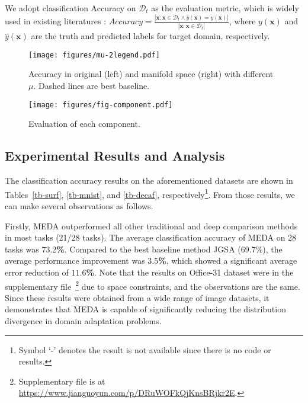 \documentclass[sigconf]{acmart}
\begin{document}
We adopt classification Accuracy on $\mathcal{D}_t$ as the evaluation metric, which is widely used in existing literatures \cite{pan2011domain,wang2017balanced,gong2012geodesic}: $Accuracy = \frac{|\mathbf{x}: \mathbf{x} \in \mathcal{D}_t \wedge \hat{y}(\mathbf{x})=y(\mathbf{x})|}{|\mathbf{x}:\mathbf{x} \in \mathcal{D}_t|}$, where $y(\mathbf{x})$ and $\hat{y}(\mathbf{x})$ are the truth and predicted labels for target domain, respectively.

\begin{figure}[t!]
	\centering
	\vspace{-.1in}
	\texttt{[image: figures/mu-2legend.pdf]}
	\vspace{-.1in}
	\caption{Accuracy in original (left) and manifold space (right) with different $\mu$. Dashed lines are best baseline.}
	\label{fig-mu}
	\vspace{-.1in}
\end{figure}

\begin{figure}[t!]
	\centering
	\vspace{-.1in}
	\texttt{[image: figures/fig-component.pdf]}
	\vspace{-.15in}
	\caption{Evaluation of each component.}
	\label{fig-component}
	\vspace{-.15in}
\end{figure}

\subsection{Experimental Results and Analysis}
The classification accuracy results on the aforementioned datasets are shown in Tables~\ref{tb-surf}, \ref{tb-mnist}, and \ref{tb-decaf}, respectively\footnote{Symbol `-' denotes the result is not available since there is no code or results.}. From those results, we can make several observations as follows. 

Firstly, MEDA outperformed all other traditional and deep comparison methods in most tasks (21/28 tasks). The average classification accuracy of MEDA on 28 tasks was $\bm{73.2}$\textbf{\%}. Compared to the best baseline method JGSA (69.7\%), the average performance improvement was $\bm{3.5}$\textbf{\%}, which showed a significant average error reduction of $\bm{11.6}$\textbf{\%}. Note that the results on Office-31 dataset were in the supplementary file~\footnote{Supplementary file is at \url{https://www.jianguoyun.com/p/DRuWOFkQjKnsBRjkr2E}.} due to space constraints, and the observations are the same. Since these results were obtained from a wide range of image datasets, it demonstrates that MEDA is capable of significantly reducing the distribution divergence in domain adaptation problems. 
\end{document}
